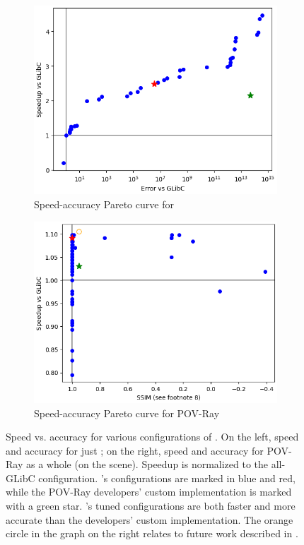 \documentclass[paper.tex]{subfiles}
\begin{document}
\begin{figure}
  \begin{subfigure}{0.48\linewidth}
    \includegraphics[width=\linewidth]{images/case_study_expression.png}
    \caption{Speed-accuracy Pareto curve for }
    \label{fig:povray-expression}
  \end{subfigure}%
  \hfill%
  \begin{subfigure}{0.48\linewidth}
    \includegraphics[width=\linewidth]{images/case_study_end_to_end.png}
    \caption{Speed-accuracy Pareto curve for POV-Ray}
    \label{fig:povray-end2end}
  \end{subfigure}
  \caption{Speed vs. accuracy for various configurations of .
    On the left, speed and accuracy for just ;
      on the right, speed and accuracy for POV-Ray as a whole
      (on the  scene).
    Speedup is normalized to the all-GLibC configuration.
    \name's configurations are marked in blue and red,
      while the POV-Ray developers' custom implementation
      is marked with a green star.
    \name's tuned configurations are both faster and more accurate
      than the developers' custom implementation.
    The orange circle in the graph on the right
      relates to future work described in .
    }
\end{figure}
\end{document}

